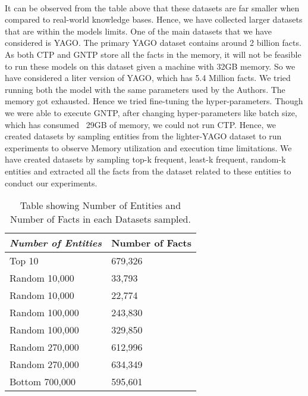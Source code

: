 \documentclass[Other]{iitddiss}
\begin{document}
\paragraph{} 
It can be observed from the table above that these datasets are far smaller when compared to real-world knowledge bases. Hence, we have collected larger datasets that are within the models limits. One of the main datasets that we have considered is YAGO. The primary YAGO dataset contains around 2 billion facts. As both CTP and GNTP store all the facts in the memory, it will not be feasible to run these models on this dataset given a machine with 32GB memory. So we have considered a liter version of YAGO, which has 5.4 Million facts. We tried running both the model with the same parameters used by the Authors. The memory got exhausted. Hence we tried fine-tuning the hyper-parameters. Though we were able to execute GNTP, after changing hyper-parameters like batch size, which has consumed ~29GB of memory, we could not run CTP. Hence, we created datasets by sampling entities from the lighter-YAGO dataset to run experiments to observe Memory utilization and execution time limitations. We have created datasets by sampling top-k frequent, least-k frequent, random-k entities and extracted all the facts from the dataset related to these entities to conduct our experiments.
\\

\begin{table}[]
	\centering
	\begin{tabular}{|l|l|}
		\hline
		\textit{\textbf{Number of Entities}} & \textbf{Number of Facts} \\ \hline
		Top 10                               & 679,326                  \\ \hline
		Random 10,000                        & 33,793                   \\ \hline
		Random 10,000                        & 22,774                   \\ \hline
		Random 100,000                       & 243,830                  \\ \hline
		Random 100,000                       & 329,850                  \\ \hline
		Random 270,000                       & 612,996                  \\ \hline
		Random 270,000                       & 634,349                  \\ \hline
		Bottom 700,000                       & 595,601                  \\ \hline
	\end{tabular}
	\caption{Table showing Number of Entities and Number of Facts in each Datasets sampled.}
\label{tab:datasets}
\end{table}
\end{document}

